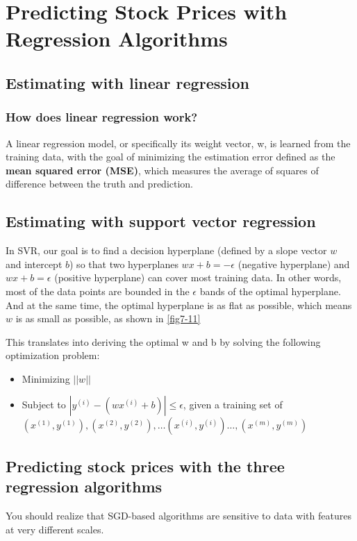 \chapter{Predicting Stock Prices with Regression Algorithms\label{Ch07}}
\section{Estimating with linear regression}
\subsection{How does linear regression work?}
A linear regression model, or specifically its weight vector, w, is learned from the training data, with the goal of minimizing the estimation error defined as the \textbf{mean squared error (MSE)}, which measures the average of squares of difference between the truth and prediction.

\section{Estimating with support vector regression}
In SVR, our goal is to find a decision hyperplane (defined by a slope vector $w$ and intercept $b$) so that two hyperplanes $wx+b=-\epsilon$ (negative hyperplane) and $wx+b=\epsilon$ (positive hyperplane) can cover most training data. In other words, most of the data points are bounded in the $\epsilon$ bands of the optimal hyperplane. And at the same time, the optimal hyperplane is as flat as possible, which means $w$ is as small as possible, as shown in \autoref{fig7-11}

This translates into deriving the optimal w and b by solving the following
optimization problem:
\begin{itemize}
    \item Minimizing $||w||$
    \item Subject to $|y^{(i)} - (wx^{(i)} + b)| \leq \epsilon$, given a training set of $(x^{(1)}, y^{(1)}), (x^{(2)}, y^{(2)}),\dots(x^{(i)}, y^{(i)})\dots, (x^{(m)}, y^{(m)})$
\end{itemize}

\section{Predicting stock prices with the three regression algorithms}
You should realize that SGD-based algorithms are sensitive to data with features at very different scales.

